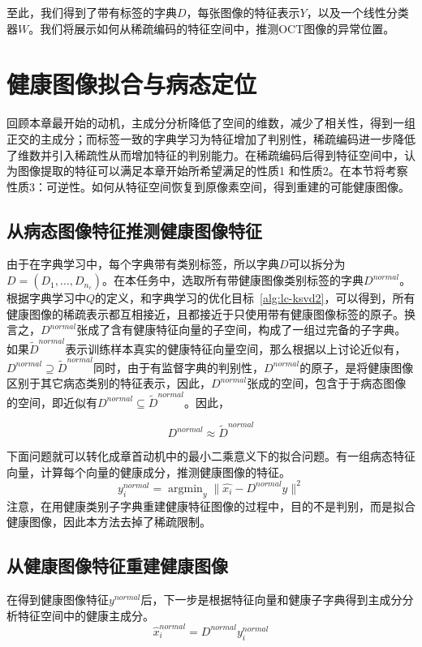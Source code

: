     至此，我们得到了带有标签的字典$D$，每张图像的特征表示$Y$，以及一个线性分类器$W$。我们将展示如何从稀疏编码的特征空间中，推测OCT图像的异常位置。

\section{健康图像拟合与病态定位}
\label{sec:norm-recon}
    回顾本章最开始的动机，主成分分析降低了空间的维数，减少了相关性，得到一组正交的主成分；而标签一致的字典学习为特征增加了判别性，稀疏编码进一步降低了维数并引入稀疏性从而增加特征的判别能力。在稀疏编码后得到特征空间中，认为图像提取的特征可以满足本章开始所希望满足的性质1 和性质2。在本节将考察性质3：可逆性。如何从特征空间恢复到原像素空间，得到重建的可能健康图像。

    \subsection{从病态图像特征推测健康图像特征}
    由于在字典学习中，每个字典带有类别标签，所以字典$D$可以拆分为$D = (D_1, \dots, D_{n_c})$。在本任务中，选取所有带健康图像类别标签的字典$D^{normal}$。根据字典学习中$Q$的定义，和字典学习的优化目标~\ref{alg:lc-ksvd2}，可以得到，所有健康图像的稀疏表示都互相接近，且都接近于只使用带有健康图像标签的原子。换言之，$D^{normal}$张成了含有健康特征向量的子空间，构成了一组过完备的子字典。如果$\tilde{D}^{normal}$表示训练样本真实的健康特征向量空间，那么根据以上讨论近似有，$D^{normal} \supseteq \tilde{D}^{normal}$同时，由于有监督字典的判别性，$D^{normal}$的原子，是将健康图像区别于其它病态类别的特征表示，因此，$D^{normal}$张成的空间，包含于于病态图像的空间，即近似有$D^{normal} \subseteq \tilde{D}^{normal}$。因此，

    \begin{equation}
        D^{normal} \approx \tilde{D}^{normal}
    \end{equation}

    下面问题就可以转化成章首动机中的最小二乘意义下的拟合问题。有一组病态特征向量，计算每个向量的健康成分，推测健康图像的特征。
    \begin{equation}
        y_i^{normal} = \mathop{\arg \min} _{y} \|\hat{x_i} - D^{normal} y\| ^ 2 
    \end{equation}
    注意，在用健康类别子字典重建健康特征图像的过程中，目的不是判别，而是拟合健康图像，因此本方法去掉了稀疏限制。
    


    \subsection{从健康图像特征重建健康图像}
    在得到健康图像特征$y^{normal}$后，下一步是根据特征向量和健康子字典得到主成分分析特征空间中的健康主成分。
    \begin{equation}
        \hat{x}_i^{normal} = D^{normal} y_i^{normal}
    \end{equation}

